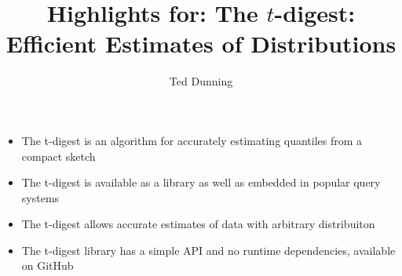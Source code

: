 \documentclass[11pt, oneside]{article}   	%
\title{Highlights for: The $t$-digest: Efficient Estimates of Distributions}
\author{Ted Dunning}
\begin{document}
\maketitle
\begin{itemize}
\item The t-digest is an algorithm for accurately estimating quantiles from a compact
sketch

\item The t-digest is available as a library as well as embedded in popular query systems

\item The t-digest allows accurate estimates of data with arbitrary distribuiton

\item The t-digest library has a simple API and no runtime dependencies, available on GitHub
\end{itemize}
\end{document}
